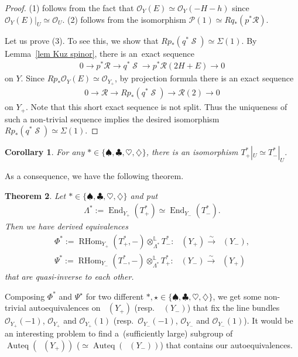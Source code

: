 \documentclass[pdftex]{sigma}
\DeclareMathOperator{\Auteq}{Auteq}
\DeclareMathOperator{\D}{D^b}
\DeclareMathOperator{\End}{End}
\DeclareMathOperator{\RHom}{RHom}
\DeclareMathOperator{\Spi}{\mathcal{S}}
\newcommand{\stsh}{\mathcal{O}}
\numberwithin{equation}{section}
\newtheorem{Theorem}{Theorem}[section]
\newtheorem{Corollary}[Theorem]{Corollary}
\begin{document}
\begin{proof}
(1) follows from the fact that $\stsh_Y(E) \simeq \stsh_Y(-H-h)$ since $\stsh_Y(E)|_U \simeq \stsh_U$.
(2) follows from the isomorphism $\mathcal{P}(1) \simeq Rq_*(p^*\mathcal{R})$.

Let us prove (3).
To see this, we show that $Rp_*(q^*\Spi) \simeq \Sigma(1)$.
By Lemma~\ref{lem Kuz spinor}, there is an~exact sequence
\begin{gather*}
0 \to p^*\mathcal{R} \to q^* \Spi \to p^* \mathcal{R}(2H+E) \to 0
\end{gather*}
on $Y$.
Since $Rp_*\stsh_Y(E) \simeq \stsh_{Y_+}$, by projection formula there is an exact sequence
\begin{gather*}
0 \to \mathcal{R} \to Rp_*(q^* \Spi) \to \mathcal{R}(2) \to 0
\end{gather*}
on $Y_+$.
Note that this short exact sequence is not split.
Thus the uniqueness of such a non-trivial sequence implies the desired isomorphism $Rp_*(q^*\Spi) \simeq \Sigma(1)$.
\end{proof}

\begin{Corollary}
For any $\ast \in \{ \spadesuit, \clubsuit, \heartsuit, \diamondsuit \}$, there is an isomorphism $T_+^{\ast}|_U \simeq T_-^{\ast}|_U$.
\end{Corollary}

As a consequence, we have the following theorem.

\begin{Theorem}
Let $\ast \in \{ \spadesuit, \clubsuit, \heartsuit, \diamondsuit \}$ and put
\begin{gather*}
\Lambda^{\ast} := \End_{Y_+}(T_+^{\ast}) \simeq \End_{Y_-}(T_-^{\ast}).
\end{gather*}
Then we have derived equivalences
\begin{align*}
\Phi^{\ast} := \RHom_{Y_+}(T^{\ast}_+, -) \otimes^{\mathbb{L}}_{\Lambda^{\ast}} T_-^{\ast}\colon\ \D(Y_+) \xrightarrow{\sim} \D(Y_-), \\
\Psi^{\ast} := \RHom_{Y_-}(T^{\ast}_-, -) \otimes^{\mathbb{L}}_{\Lambda^{\ast}} T_+^{\ast}\colon\ \D(Y_-) \xrightarrow{\sim} \D(Y_+)
\end{align*}
that are quasi-inverse to each other.
\end{Theorem}

\begin{Remark} \rm
Composing $\Phi^{\ast}$ and $\Psi^{\star}$ for two different $\ast, \star \in \{ \spadesuit, \clubsuit, \heartsuit, \diamondsuit \}$,
we get some non-trivial autoequivalences on $\D(Y_+)$ (resp.~$\D(Y_-)$) that fix the line bundles $\stsh_{Y_+}(-1)$, $\stsh_{Y_+}$ and $\stsh_{Y_+}(1)$
(resp.~$\stsh_{Y_-}(-1)$, $\stsh_{Y_-}$ and $\stsh_{Y_-}(1)$).
It would be an interesting problem to find a~(sufficiently large) subgroup of $\Auteq(\D(Y_+))$ ($\simeq \Auteq(\D(Y_-))$) that contains our autoequivalences.
\end{Remark}
\end{document}
